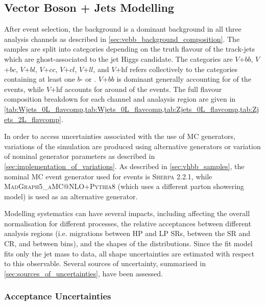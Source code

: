 \subsection{Vector Boson + Jets Modelling}\label{sec:vjets_modelling}

After event selection, the \Vjets background is a dominant background in all three analysis channels as described in \cref{sec:vebb_background_composition}.
The \Vjets samples are split into categories depending on the truth flavour of the track-jets which are ghost-associated to the \largeR jet Higgs candidate.
The categories are $V$+$bb$, $V$+$bc$, $V$+$bl$, $V$+$cc$, $V$+$cl$, $V$+$ll$, and $V$+hf refers collectively to the categories containing at least one $b$- or \cjet.
$V$+$bb$ is dominant generally accounting for  of the events, while $V$+hf accounts for around  of the events.
The full flavour composition breakdown for each channel and analaysis region are given in \cref{tab:Wjets_0L_flavcomp,tab:Wjets_0L_flavcomp,tab:Zjets_0L_flavcomp,tab:Zjets_2L_flavcomp}.

In order to access uncertainties associated with the use of MC generators, variations of the simulation are produced using alternative generators or variation of nominal generator parameters as described in \cref{sec:implementation_of_variations}.
As described in \cref{sec:vhbb_samples}, the nominal MC event generator used for \Vjets events is \textsc{Sherpa 2.2.1}, while \textsc{MadGraph5\_aMC@NLO+Pythia8} (which uses a different parton showering model) is used as an alternative generator.

Modelling systematics can have several impacts, including affecting the overall normalisation for different processes, the relative acceptances between different analysis regions (i.e. migrations between HP and LP SRs, between the SR and CR, and between \pTV bins), and the shapes of the \mJ distributions.
Since the fit model fits only the \largeR jet mass \mJ to data, all shape uncertainties are estimated with respect to this observable.
Several sources of uncertainty, summarised in \cref{sec:sources_of_uncertainties}, have been assessed.








\subsubsection{Acceptance Uncertainties}\label{sec:acceptance_uncertainties}

